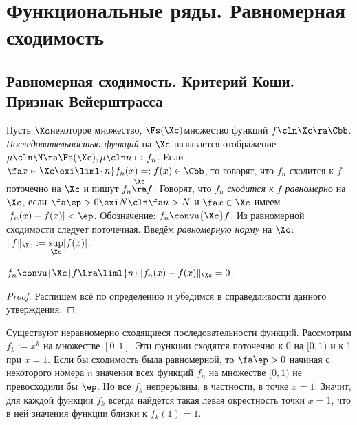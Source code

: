 \documentclass[a4paper]{article}
\begin{document}
\section{Функциональные ряды. Равномерная сходимость}

\subsection{Равномерная сходимость. Критерий Коши. Признак Вейерштрасса}

\begin{df}
Пусть $\Xc$\т некоторое множество, $\Fs(\Xc)$\т множество функций $f\cln \Xc \ra \Cbb$. \emph{Последовательностью функций} на $\Xc$ называется
отображение $\mu\cln \N \ra \Fs(\Xc), \mu\cln n \mapsto f_n$. Если $\fa x \in \Xc \exi \liml{n} f_n(x) =: f(x) \in \Cbb$, то говорят, что
$f_n$ сходится к $f$ поточечно на $\Xc$ и пишут $f_n \overset{\Xc}{\ra} f$. Говорят, что $f_n$ \emph{сходится к $f$ равномерно} на $\Xc$,
если $\fa \ep > 0 \exi N\cln \fa n > N$ и $\fa x \in \Xc$ имеем $|f_n(x)-f(x)| < \ep$.
Обозначение: $f_n \convu{\Xc} f$. Из равномерной сходимости следует поточечная. Введём \emph{равномерную норму}
на $\Xc$: $\|f\|_\Xc := \underset{\Xc}{\sup} |f(x)|$.
\end{df}

\begin{theorem}
$f_n \convu{\Xc} f \Lra \liml{n}\|f_n(x)-f(x)\|_\Xc = 0$.
\end{theorem}
\begin{proof}
Распишем всё по определению и убедимся в справедливости данного утверждения.
\end{proof}

\begin{note}
Существуют неравномерно сходящиеся последовательности функций. Рассмотрим $f_k := x^k$ на множестве $[0,1]$. Эти функции
сходятся поточечно к 0 на $[0,1)$ и к 1 при $x=1$. Если бы сходимость была равномерной, то $\fa \ep > 0$ начиная с некоторого номера $n$
значения всех функций $f_n$ на множестве $[0,1)$ не превосходили бы $\ep$. Но все $f_k$ непрерывны, в частности, в точке $x=1$. Значит,
для каждой функции $f_k$ всегда найдётся такая левая окрестность точки $x=1$, что в ней значения функции близки к $f_k(1)=1$.
\end{note}
\end{document}
